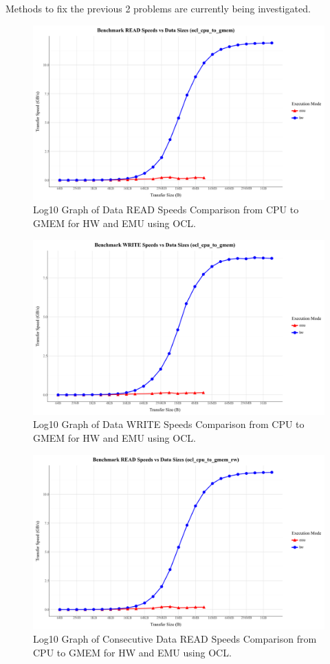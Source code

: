 Methods to fix the previous 2 problems are currently being investigated. \\

\begin{figure}[H]
    \centering
    \includegraphics[width=0.9\linewidth]{content/ocl_cpu_to_gmem_READ.png}
    \caption{Log10 Graph of Data READ Speeds Comparison from CPU to GMEM for HW and EMU using OCL.}
    \label{fig:enter-label}
\end{figure}

\begin{figure}[H]
    \centering
    \includegraphics[width=0.9\linewidth]{content/ocl_cpu_to_gmem_WRITE.png}
    \caption{Log10 Graph of Data WRITE Speeds Comparison from CPU to GMEM for HW and EMU using OCL.}
    \label{fig:enter-label}
\end{figure}

\begin{figure}[H]
    \centering
    \includegraphics[width=0.9\linewidth]{content/ocl_cpu_to_gmem_rw_READ.png}
    \caption{Log10 Graph of Consecutive Data READ Speeds Comparison from CPU to GMEM for HW and EMU using OCL.}
    \label{fig:enter-label}
\end{figure}

